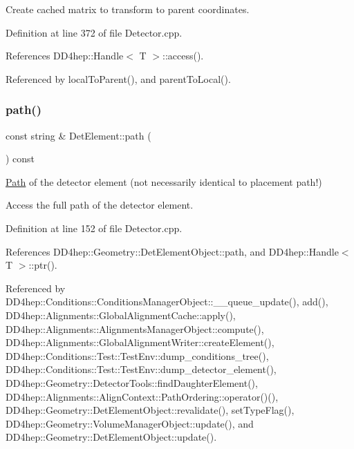 Create cached matrix to transform to parent coordinates. 



Definition at line 372 of file Detector.\+cpp.



References D\+D4hep\+::\+Handle$<$ T $>$\+::access().



Referenced by local\+To\+Parent(), and parent\+To\+Local().

\hypertarget{class_d_d4hep_1_1_geometry_1_1_det_element_a5f8b4268684a3cd4a5f613181a8bac83}{}\label{class_d_d4hep_1_1_geometry_1_1_det_element_a5f8b4268684a3cd4a5f613181a8bac83} 
\subsubsection{\texorpdfstring{path()}{path()}}
{\footnotesize\ttfamily const string \& Det\+Element\+::path (\begin{DoxyParamCaption}{ }\end{DoxyParamCaption}) const}



\hyperlink{class_d_d4hep_1_1_path}{Path} of the detector element (not necessarily identical to placement path!) 

Access the full path of the detector element. 

Definition at line 152 of file Detector.\+cpp.



References D\+D4hep\+::\+Geometry\+::\+Det\+Element\+Object\+::path, and D\+D4hep\+::\+Handle$<$ T $>$\+::ptr().



Referenced by D\+D4hep\+::\+Conditions\+::\+Conditions\+Manager\+Object\+::\+\_\+\+\_\+queue\+\_\+update(), add(), D\+D4hep\+::\+Alignments\+::\+Global\+Alignment\+Cache\+::apply(), D\+D4hep\+::\+Alignments\+::\+Alignments\+Manager\+Object\+::compute(), D\+D4hep\+::\+Alignments\+::\+Global\+Alignment\+Writer\+::create\+Element(), D\+D4hep\+::\+Conditions\+::\+Test\+::\+Test\+Env\+::dump\+\_\+conditions\+\_\+tree(), D\+D4hep\+::\+Conditions\+::\+Test\+::\+Test\+Env\+::dump\+\_\+detector\+\_\+element(), D\+D4hep\+::\+Geometry\+::\+Detector\+Tools\+::find\+Daughter\+Element(), D\+D4hep\+::\+Alignments\+::\+Align\+Context\+::\+Path\+Ordering\+::operator()(), D\+D4hep\+::\+Geometry\+::\+Det\+Element\+Object\+::revalidate(), set\+Type\+Flag(), D\+D4hep\+::\+Geometry\+::\+Volume\+Manager\+Object\+::update(), and D\+D4hep\+::\+Geometry\+::\+Det\+Element\+Object\+::update().

